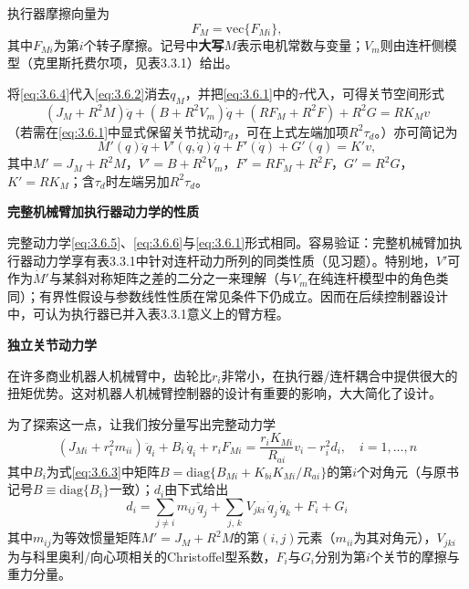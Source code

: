 \documentclass[12pt,a4paper]{ctexart}
\begin{document}
执行器摩擦向量为
\[
F_M = \text{vec}\{F_{Mi}\},
\]
其中$F_{Mi}$为第$i$个转子摩擦。记号中\textbf{大写$M$}表示电机常数与变量；$V_m$则由连杆侧模型（克里斯托费尔项，见表3.3.1）给出。

将\eqref{eq:3.6.4}代入\eqref{eq:3.6.2}消去$q_M$，并把\eqref{eq:3.6.1}中的$\tau$代入，可得关节空间形式
\begin{equation}\label{eq:3.6.5}
\left(J_M + R^2 M\right)\ddot{q} + \left(B + R^2 V_m\right)\dot{q} + \left(R F_M + R^2 F\right) + R^2 G = R K_M v
\end{equation}
（若需在\eqref{eq:3.6.1}中显式保留关节扰动$\tau_d$，可在上式左端加项$R^2\tau_d$。）亦可简记为
\begin{equation}\label{eq:3.6.6}
M'(q)\ddot{q} + V'(q,\dot{q})\dot{q} + F'(\dot{q}) + G'(q) = K' v,
\end{equation}
其中$M'=J_M + R^2 M$，$V'=B + R^2 V_m$，$F'=R F_M + R^2 F$，$G'=R^2 G$，$K'=R K_M$；含$\tau_d$时左端另加$R^2\tau_d$。

\textbf{完整机械臂加执行器动力学的性质}

完整动力学\eqref{eq:3.6.5}、\eqref{eq:3.6.6}与\eqref{eq:3.6.1}形式相同。容易验证：完整机械臂加执行器动力学享有表3.3.1中针对连杆动力所列的同类性质（见习题）。特别地，$V'$可作为$\dot{M}'$与某斜对称矩阵之差的二分之一来理解（与$V_m$在纯连杆模型中的角色类同）；有界性假设与参数线性性质在常见条件下仍成立。因而在后续控制器设计中，可认为执行器已并入表3.3.1意义上的臂方程。

\textbf{独立关节动力学}

在许多商业机器人机械臂中，齿轮比$r_i$非常小，在执行器/连杆耦合中提供很大的扭矩优势。这对机器人机械臂控制器的设计有重要的影响，大大简化了设计。

为了探索这一点，让我们按分量写出完整动力学
\begin{equation}\label{eq:3.6.7}
(J_{Mi} + r_i^2 m_{ii})\,\ddot{q}_i + B_i\,\dot{q}_i + r_i F_{Mi} = \frac{r_i K_{Mi}}{R_{ai}} v_i - r_i^2 d_i, \quad i = 1,\ldots,n
\end{equation}
其中$B_i$为式\eqref{eq:3.6.3}中矩阵$B=\mathrm{diag}\{B_{Mi}+K_{bi}K_{Mi}/R_{ai}\}$的第$i$个对角元（与原书记号$B\equiv\mathrm{diag}\{B_i\}$一致）；$d_i$由下式给出
\begin{equation}\label{eq:3.6.8}
d_i = \sum_{j \neq i} m_{ij}\,\ddot{q}_j + \sum_{j,\,k} V_{jki}\,\dot{q}_j\,\dot{q}_k + F_i + G_i
\end{equation}
其中$m_{ij}$为等效惯量矩阵$M' = J_M + R^2 M$的第$(i,j)$元素（$m_{ii}$为其对角元），$V_{jki}$为与科里奥利/向心项相关的Christoffel型系数，$F_i$与$G_i$分别为第$i$个关节的摩擦与重力分量。
\end{document}
